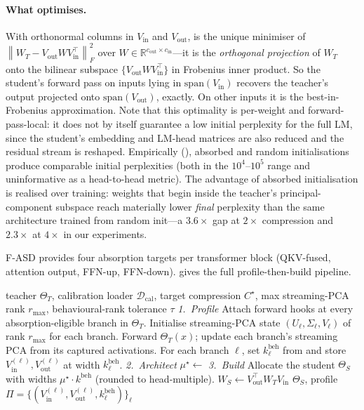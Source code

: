 \documentclass[11pt]{article}
\newcommand{\R}{\mathbb{R}}
\newcommand{\norm}[1]{\left\lVert#1\right\rVert}
\newcommand{\Vin}{V_{\mathrm{in}}}
\newcommand{\Vout}{V_{\mathrm{out}}}
\newcommand{\Wt}{W_T}
\newcommand{\Ws}{W_S}
\newcommand{\fasd}{\textsc{F-ASD}}
\begin{document}
\paragraph{What  optimises.}
With orthonormal columns in $\Vin$ and $\Vout$,  is the
unique minimiser of $\norm{\Wt - \Vout W \Vin^\top}_F^2$ over
$W \in \R^{c_{\mathrm{out}}\times c_{\mathrm{in}}}$---it is the
\emph{orthogonal projection} of $\Wt$ onto the bilinear subspace
$\{\Vout W \Vin^\top\}$ in Frobenius inner product. So the student's
forward pass on inputs lying in $\mathrm{span}(\Vin)$ recovers the
teacher's output projected onto $\mathrm{span}(\Vout)$, exactly. On other
inputs it is the best-in-Frobenius approximation. Note that this
optimality is per-weight and forward-pass-local: it does not by itself
guarantee a low initial perplexity for the full LM, since the student's
embedding and LM-head matrices are also reduced and the residual stream
is reshaped. Empirically (), absorbed and random
initialisations produce comparable initial perplexities (both in the
$10^4$--$10^5$ range and uninformative as a head-to-head metric).
The advantage of absorbed initialisation is realised over training:
weights that begin inside the teacher's principal-component subspace
reach materially lower \emph{final} perplexity than the same architecture
trained from random init---a $3.6\times$ gap at $2\times$ compression
and $2.3\times$ at $4\times$ in our experiments.

\fasd{} provides four absorption targets per transformer block (QKV-fused,
attention output, FFN-up, FFN-down).  gives the full
profile-then-build pipeline.

\begin{algorithm}[t]
\caption{\fasd{}: profile and build a student.}
\label{alg:fasd}
\begin{algorithmic}[1]
\Require teacher $\Theta_T$, calibration loader $\mathcal{D}_{\mathrm{cal}}$, target compression $C^\star$,
        max streaming-PCA rank $r_{\max}$, behavioural-rank tolerance $\tau$
\Statex \textit{1.\ Profile}
\State Attach forward hooks at every absorption-eligible branch in $\Theta_T$.
\State Initialise streaming-PCA state $(U_\ell,\Sigma_\ell,V_\ell)$ of rank $r_{\max}$ for each branch.
  \State Forward $\Theta_T(x)$; update each branch's streaming PCA from its captured activations.
\EndFor
\State For each branch $\ell$, set $k^{\mathrm{beh}}_\ell$ from  and store $\Vin^{(\ell)},\Vout^{(\ell)}$ at width $k^{\mathrm{beh}}_\ell$.
\Statex \textit{2.\ Architect}
\State $\mu^\star \gets$  
\Statex \textit{3.\ Build}
\State Allocate the student $\Theta_S$ with widths $\mu^\star \cdot k^{\mathrm{beh}}$ (rounded to head-multiple).
\For{each absorption-eligible weight $\Wt$ in $\Theta_T$}
  \State $\Ws \gets \Vout^\top \Wt \Vin$ 
\EndFor
\State \Return $\Theta_S$, profile $\Pi = \{(\Vin^{(\ell)},\Vout^{(\ell)},k^{\mathrm{beh}}_\ell)\}_\ell$
\end{algorithmic}
\end{algorithm}
\end{document}
